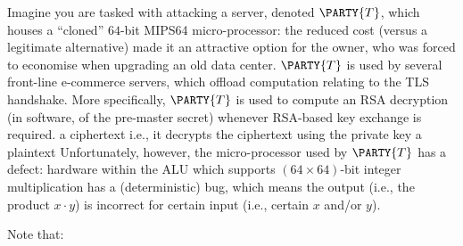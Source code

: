 %



Imagine you are tasked with attacking a server, denoted 
$\PARTY{T}$, 
which houses a ``cloned'' $64$-bit MIPS64 micro-processor: the reduced cost 
(versus a legitimate alternative) 
made it an attractive option for the owner, who was forced to economise when
upgrading an old data center.
$\PARTY{T}$ 
is used by several front-line e-commerce servers, which offload computation 
relating to the TLS handshake.  More specifically, 
$\PARTY{T}$ 
is used to compute an RSA decryption (in software, of the pre-master secret)
whenever RSA-based key exchange is required.
{a ciphertext}
{i.e., it decrypts the ciphertext using the private key}
{a  plaintext}
Unfortunately, however, the micro-processor used by 
$\PARTY{T}$ 
has a defect: hardware within the ALU which supports $( 64 \times 64 )$-bit 
integer multiplication has a (deterministic) bug, which means
the    output (i.e., the product $x \cdot y$)
is incorrect for 
certain input (i.e., certain $x$ and/or $y$).




%
Note that:

